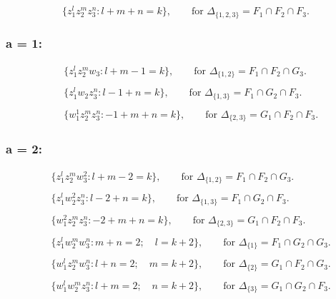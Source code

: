 \documentclass[11pt]{article}
\begin{document}
\[ \{ z_{1}^{l}z_{2}^{m}z_{3}^{n} : l + m + n = k \}, \qquad \text{for } \Delta_{\{1,2,3\}} = F_{1} \cap F_{2} \cap F_{3}. \]

\hypertarget{a-1}{%
\subsubsection{a = 1:}\label{a-1}}

\[ \begin{split} &\{ z_{1}^{l}z_{2}^{m}w_{3} : l + m - 1 = k \}, \qquad \text{for } \Delta_{\{1,2\}} = F_{1} \cap F_{2} \cap G_{3}. \\ & \\ &\{ z_{1}^{l}w_{2}z_{3}^{n} : l - 1 + n = k \}, \qquad \text{for } \Delta_{\{1,3\}} = F_{1} \cap G_{2} \cap F_{3}. \\ \ & \\ &\{ w_{1}^{1}z_{2}^{m}z_{3}^{n} : -1 + m + n = k \}, \qquad \text{for } \Delta_{\{2,3\}} = G_{1} \cap F_{2} \cap F_{3}. \end{split} \]

\hypertarget{a-2}{%
\subsubsection{a = 2:}\label{a-2}}

\[ \begin{split} &\{ z_{1}^{l}z_{2}^{m}w_{3}^{2} : l + m - 2 = k \}, \qquad \text{for } \Delta_{\{1,2\}} = F_{1} \cap F_{2} \cap G_{3}. \\ & \\ &\{ z_{1}^{l}w_{2}^{2}z_{3}^{n} : l - 2 + n = k \}, \qquad \text{for } \Delta_{\{1,3\}} = F_{1} \cap G_{2} \cap F_{3}. \\ \ & \\ &\{ w_{1}^{2}z_{2}^{m}z_{3}^{n} : -2 + m + n = k \}, \qquad \text{for } \Delta_{\{2,3\}} = G_{1} \cap F_{2} \cap F_{3}. \\ & \\ & \{ z_{1}^{l}w_{2}^{m}w_{3}^{n} : m + n = 2;\quad l = k + 2 \}, \qquad \text{for } \Delta_{\{1\}} = F_{1} \cap G_{2} \cap G_{3}. \\ & \\ &\{ w_{1}^{l}z_{2}^{m}w_{3}^{n} : l + n = 2;\quad m = k + 2 \}, \qquad \text{for } \Delta_{\{2\}} = G_{1} \cap F_{2} \cap G_{3}. \\ & \\ &\{ w_{1}^{l}w_{2}^{m}z_{3}^{n} : l + m = 2;\quad n = k + 2 \}, \qquad \text{for } \Delta_{\{3\}} = G_{1} \cap G_{2} \cap F_{3}. \end{split} \]
\end{document}
